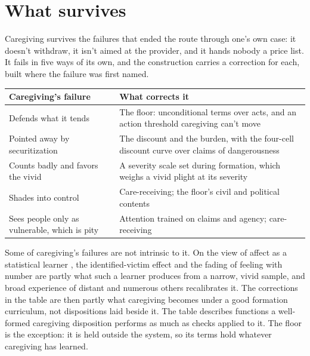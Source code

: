 \section{What survives}
\label{sec:23.8}
Caregiving survives the failures that ended the route through one's own case: it doesn't withdraw, it isn't aimed at the provider, and it hands nobody a price list. It fails in five ways of its own, and the construction carries a correction for each, built where the failure was first named.

\begingroup\small\renewcommand{\arraystretch}{1.12}
\begin{longtable}{@{}>{\raggedright\arraybackslash}p{}>{\raggedright\arraybackslash}p{}@{}}
\hline
\textbf{Caregiving's failure} & \textbf{What corrects it} \\
\hline
\endhead
Defends what it tends & The floor: unconditional terms over acts, and an action threshold caregiving can't move \\ \hline
Pointed away by securitization & The discount and the burden, with the four-cell discount curve over claims of dangerousness \\ \hline
Counts badly and favors the vivid & A severity scale set during formation, which weighs a vivid plight at its severity \\ \hline
Shades into control & Care-receiving; the floor's civil and political contents \\ \hline
Sees people only as vulnerable, which is pity & Attention trained on claims and agency; care-receiving \\ \hline
\end{longtable}
\endgroup

Some of caregiving's failures are not intrinsic to it. On the view of affect as a statistical learner \autocite{railton2014affective}, the identified-victim effect and the fading of feeling with number are partly what such a learner produces from a narrow, vivid sample, and broad experience of distant and numerous others recalibrates it. The corrections in the table are then partly what caregiving becomes under a good formation curriculum, not dispositions laid beside it. The table describes functions a well-formed caregiving disposition performs as much as checks applied to it. The floor is the exception: it is held outside the system, so its terms hold whatever caregiving has learned.

